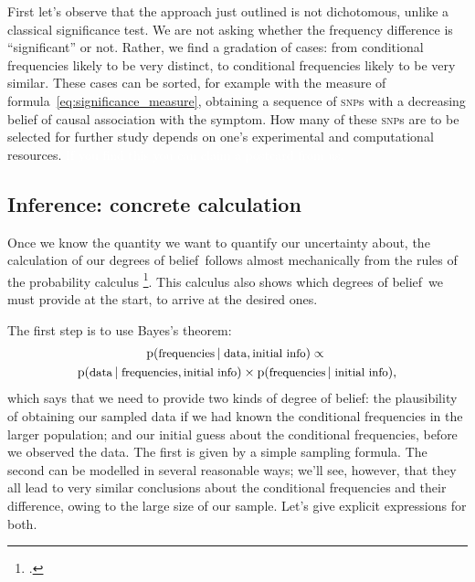 \documentclass[\ifafour a4paper,12pt,\else a5paper,10pt,\fi%
onecolumn,oneside,article,%
british%
]{memoir}
\theoremstyle{remark}
\theoremstyle{innote}
\newcommand*{\citep}{\footcites}
\newcommand*{\pf}{\mathrm{p}}%
\renewcommand*{\|}[1][]{\nonscript\,#1\vert\nonscript\;\mathopen{}}
\newcommand*{\puzzle}{{\fontencoding{U}\fontfamily{fontawesometwo}\selectfont\symbol{225}}}
\newcommand{\mynote}[1]{ {\color{notecolour}\puzzle\ #1}}
\newcommand*{\dob}{degree of belief}
\newcommand*{\dobs}{degrees of belief}
\newcommand*{\ptext}[1]{\text{\small #1}}
\newcommand*{\snp}{\textsc{snp}}
\begin{document}
\medskip

First let's observe that the approach just outlined is not dichotomous,
unlike a classical significance test. We are not asking whether the
frequency difference is \enquote{significant} or not. Rather, we find a
gradation of cases: from conditional frequencies likely to be very
distinct, to conditional frequencies likely to be very similar. These cases
can be sorted, for example with the measure of
formula~\eqref{eq:significance_measure}, obtaining a sequence of \snp s
with a decreasing belief of causal association with the symptom. How many
of these \snp s are to be selected for further study depends on one's
experimental and computational resources.
\textcolor{white}{If you find this you can claim a postcard from us.}





\subsection{Inference: concrete calculation}
\label{sec:inference}

Once we know the quantity we want to quantify our uncertainty about, the
calculation of our \dobs\ follows almost mechanically from the rules of the
probability calculus
\citep{jeffreys1939_r1983,cox1946,jaynes1994_r2003,hailperin1996}. This
calculus also shows which \dobs\ we must provide at the start, to arrive at
the desired ones.

The first step is to use Bayes's theorem:
\begin{multline}
  \label{eq:intuitive_Bayes}
  \pf(\ptext{frequencies} \| \ptext{data}, \ptext{initial info})
  \propto{}\\
  \pf(\ptext{data} \| \ptext{frequencies}, \ptext{initial info})
  \times
  \pf(\ptext{frequencies} \| \ptext{initial info}),
\end{multline}
which says that we need to provide two kinds of \dob: the plausibility of
obtaining our sampled data if we had known the conditional frequencies in
the larger population; and our initial guess about the conditional
frequencies, before we observed the data. The first is given by a simple
sampling formula. The second can be modelled in several reasonable ways;
we'll see, however, that they all lead to very similar conclusions about
the conditional frequencies and their difference, owing to the large size
of our sample. Let's give explicit expressions for both.
\end{document}
